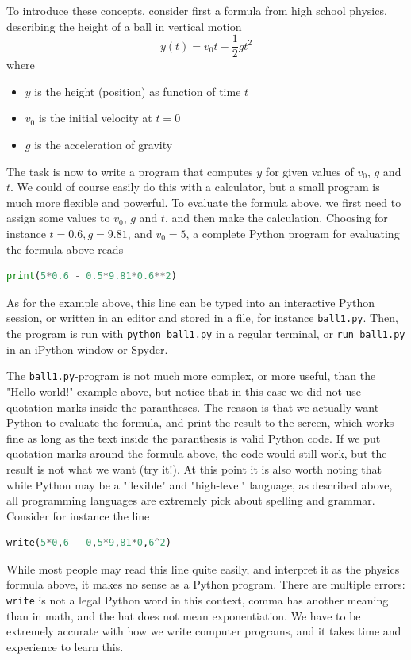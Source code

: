 \documentclass[graybox,envcountchap,sectrefs,final]{svmonodo}
\begin{document}
\noindent
To introduce these concepts, consider first a
formula from high school physics, describing the height of a ball in vertical motion
\[ y(t) = v_0t- \frac{1}{2}gt^2 \]
where
\begin{itemize}
  \item $y$ is the height (position) as function of time $t$

  \item $v_0$ is the initial velocity at $t=0$

  \item $g$ is the acceleration of gravity
\end{itemize}

\noindent
The task is now to write a program that computes $y$ for given values of $v_0$, $g$ and $t$. We could of course easily do
this with a calculator, but a small program is much more flexible and powerful. To evaluate the formula above,
we first need to assign some values to $v_0$, $g$ and $t$, and then make the calculation. Choosing for instance
$t=0.6, g = 9.81$, and $v_0=5$, a complete Python program for evaluating the formula above reads
\begin{lstlisting}[language=Python,style=blue1bar]
print(5*0.6 - 0.5*9.81*0.6**2)
\end{lstlisting}
As for the example above, this line can be typed into an interactive Python session, or written in an editor and stored in a file, for instance
\texttt{ball1.py}. Then, the program is run with \texttt{python ball1.py} in a regular terminal, or \texttt{run ball1.py} in an iPython window or  Spyder.

The \texttt{ball1.py}-program is not much more complex, or more useful, than the "Hello world!"-example above, but notice that in this case
we did not use quotation marks inside the parantheses. The reason is that we actually want Python to evaluate the formula,
and print the result to the screen, which works fine as long as the text inside the paranthesis is valid Python code. If we
put quotation marks around the formula above, the code would still work, but the result is not what we want (try it!).
At this point it is also worth noting that while Python may be a "flexible" and "high-level" language, as described above,
all programming languages are extremely pick about spelling and grammar. Consider for instance the line
\begin{lstlisting}[language=Python,style=blue1]
write(5*0,6 - 0,5*9,81*0,6^2)
\end{lstlisting}
While most people may read this line quite easily, and interpret it as the physics formula above, it makes no sense
as a Python program. There are multiple errors: \texttt{write} is not a legal Python word in this context, comma has another
meaning than in math, and the hat does not mean exponentiation. We have to be extremely accurate with how we write
computer programs, and it takes time and experience to learn this.
\end{document}
